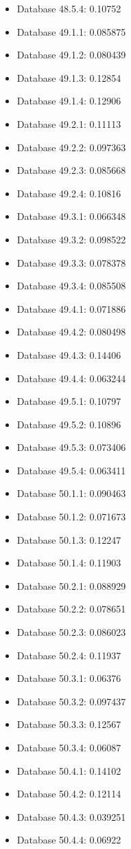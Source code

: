 \begin{itemize}
\item Database 48.5.4: 0.10752
\item Database 49.1.1: 0.085875
\item Database 49.1.2: 0.080439
\item Database 49.1.3: 0.12854
\item Database 49.1.4: 0.12906
\item Database 49.2.1: 0.11113
\item Database 49.2.2: 0.097363
\item Database 49.2.3: 0.085668
\item Database 49.2.4: 0.10816
\item Database 49.3.1: 0.066348
\item Database 49.3.2: 0.098522
\item Database 49.3.3: 0.078378
\item Database 49.3.4: 0.085508
\item Database 49.4.1: 0.071886
\item Database 49.4.2: 0.080498
\item Database 49.4.3: 0.14406
\item Database 49.4.4: 0.063244
\item Database 49.5.1: 0.10797
\item Database 49.5.2: 0.10896
\item Database 49.5.3: 0.073406
\item Database 49.5.4: 0.063411
\item Database 50.1.1: 0.090463
\item Database 50.1.2: 0.071673
\item Database 50.1.3: 0.12247
\item Database 50.1.4: 0.11903
\item Database 50.2.1: 0.088929
\item Database 50.2.2: 0.078651
\item Database 50.2.3: 0.086023
\item Database 50.2.4: 0.11937
\item Database 50.3.1: 0.06376
\item Database 50.3.2: 0.097437
\item Database 50.3.3: 0.12567
\item Database 50.3.4: 0.06087
\item Database 50.4.1: 0.14102
\item Database 50.4.2: 0.12114
\item Database 50.4.3: 0.039251
\item Database 50.4.4: 0.06922

\end{itemize}
